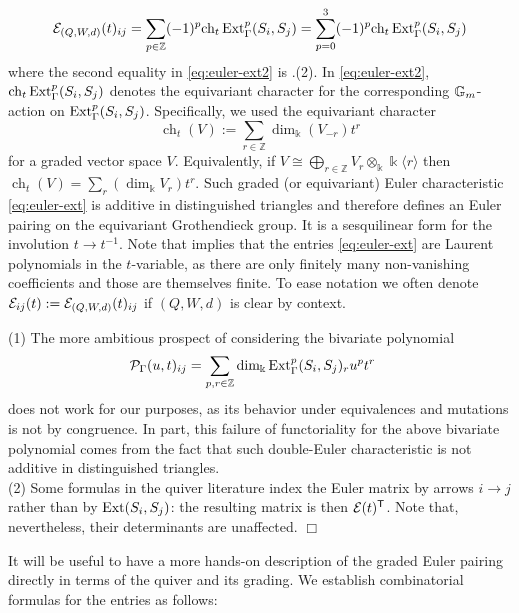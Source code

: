 \begin{equation}\label{eq:euler-ext2}
 \mathcal E_{(Q,W,d)}(t)_{ij}
 =\sum_{p\in\mathbb Z}(-1)^p
 \mbox{ch}_t\operatorname{Ext}^{p}_{\Gamma}(S_i,S_j)=\sum_{p=0}^3(-1)^p
 \mbox{ch}_t\operatorname{Ext}^{p}_{\Gamma}(S_i,S_j)
\end{equation}
where the second equality in \eqref{eq:euler-ext2} is .(2). In \eqref{eq:euler-ext2}, $ \mbox{ch}_t\operatorname{Ext}^{p}_{\Gamma}(S_i,S_j)$ denotes the equivariant character for the corresponding $\mathbb{G}_{m}$-action on $\operatorname{Ext}^{p}_{\Gamma}(S_i,S_j)$. Specifically, we used the equivariant character
\[
\operatorname{ch}_t(V)
:=
\sum_{r\in\mathbb Z}
\dim_\Bbbk\!\left(V_{-r}\right)t^r
\]
for a graded vector space $V$. Equivalently, if $V\cong\bigoplus_{r\in\mathbb Z}V_r\otimes_\Bbbk\Bbbk\langle r\rangle$ then $\operatorname{ch}_t(V)=\sum_r(\dim_\Bbbk V_r)t^r$. Such graded (or equivariant) Euler characteristic \eqref{eq:euler-ext} is additive in distinguished triangles and therefore defines an Euler pairing on the equivariant Grothendieck group. It is a sesquilinear form for the involution $t\to t^{-1}$. Note that  implies that the entries \eqref{eq:euler-ext} are Laurent polynomials in the $t$-variable, as there are only finitely many non-vanishing coefficients and those are themselves finite. To ease notation we often denote $\mathcal E_{ij}(t):=\mathcal E_{(Q,W,d)}(t)_{ij}$ if $(Q,W,d)$ is clear by context.

\begin{remark} (1) The more ambitious prospect of considering the bivariate polynomial
\begin{align*}
  \mathcal P_{\Gamma}(u,t)_{ij}
  &=\sum_{p,r\in\mathbb Z}
  \dim_\Bbbk\operatorname{Ext}^{p}_{\Gamma}(S_i,S_j)_ru^pt^{r}
\end{align*}
does not work for our purposes, as its behavior under equivalences and mutations is not by congruence. In part, this failure of functoriality for the above bivariate polynomial comes from the fact that such double-Euler characteristic is not additive in distinguished triangles.\\

\noindent (2) Some formulas in the quiver literature index the Euler matrix by arrows
\(i\to j\) rather than by \(\operatorname{Ext}(S_i,S_j)\): the resulting matrix is then \(\mathcal E(t)^{\mathsf T}\). Note that, nevertheless, their determinants are unaffected.
\hfill$\Box$\end{remark}

It will be useful to have a more hands-on description of the graded Euler pairing directly in terms of the quiver and its grading. We establish combinatorial formulas for the entries as follows:


